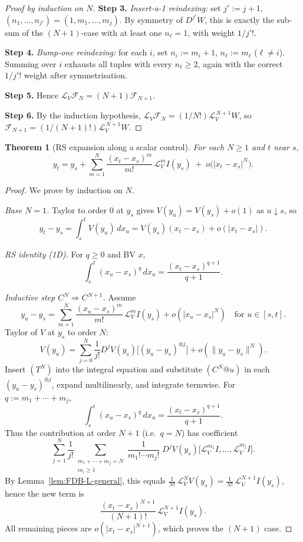 \documentclass[12pt]{article}
\newtheorem{theorem}{Theorem}[section]
\theoremstyle{remark}
\begin{document}
\begin{proof}[Proof by induction on $N$]
\noindent
\textbf{Step 3.} \emph{Insert-a-1 reindexing:} set $j':=j+1$, $(n_1,\dots,n_{j'})=(1,m_1,\dots,m_j)$.
By symmetry of $D^{j'}W$, this is exactly the sub-sum of the $(N\!+\!1)$-case with at least one $n_\ell=1$, with weight $1/j'!$.

\noindent
\textbf{Step 4.} \emph{Bump-one reindexing:} for each $i$, set $n_i:=m_i+1$, $n_\ell:=m_\ell$ ($\ell\neq i$).
Summing over $i$ exhausts all tuples with every $n_\ell\ge2$, again with the correct $1/j'!$ weight after symmetrisation.

\noindent
\textbf{Step 5.} Hence $\mathcal{L}_V\mathcal{F}_N=(N\!+\!1)\mathcal{F}_{N+1}$.

\noindent
\textbf{Step 6.} By the induction hypothesis,
$\mathcal{L}_V\mathcal{F}_N=(1/N!)\mathcal{L}_V^{\,N+1}W$, so $\mathcal{F}_{N+1}=(1/(N\!+\!1)!)\mathcal{L}_V^{\,N+1}W$.
\end{proof}


\begin{theorem}[RS expansion along a scalar control]\label{thm:CN}
For each $N\ge1$ and $t$ near $s$,
\[
\boxed{\;
y_t
= y_s+\sum_{m=1}^{N}\frac{(x_t-x_s)^m}{m!}\,\mathcal{L}_V^{m}I(y_s)
\;+\;o\big(|x_t-x_s|^{N}\big).
\;}
\]
\end{theorem}

\begin{proof}
We prove by induction on $N$.

\emph{Base $N=1$.} Taylor to order $0$ at $y_s$ gives $V(y_u)=V(y_s)+o(1)$ as $u\downarrow s$, so
\[
y_t-y_s=\int_s^t V(y_u)\,dx_u=V(y_s)(x_t-x_s)+o(|x_t-x_s|).
\]

\noindent\textit{RS identity (1D).} For $q\ge0$ and BV $x$,
\[
\int_s^t (x_u-x_s)^q\,dx_u=\frac{(x_t-x_s)^{q+1}}{q+1}.
\]

\emph{Inductive step $C^N\Rightarrow C^{N+1}$.}
Assume
\[
y_u-y_s=\sum_{m=1}^{N}\frac{(x_u-x_s)^m}{m!}\,\mathcal{L}_V^{m}I(y_s)+o(|x_u-x_s|^{N})
\quad\text{for }u\in[s,t].
\tag{$C^N@u$}
\]
Taylor of $V$ at $y_s$ to order $N$:
\[
V(y_u)=\sum_{j=0}^{N}\frac{1}{j!}D^{j}V(y_s)\big[(y_u-y_s)^{\otimes j}\big]
+o(\|y_u-y_s\|^{N}).
\tag{$T^N$}
\]
Insert $(T^N)$ into the integral equation and substitute $(C^N@u)$ in each $(y_u-y_s)^{\otimes j}$, expand multilinearly, and integrate termwise. For $q:=m_1+\cdots+m_j$,
\[
\int_s^t (x_u-x_s)^q\,dx_u=\frac{(x_t-x_s)^{q+1}}{q+1}.
\]
Thus the contribution at order $N\!+\!1$ (i.e.\ $q=N$) has coefficient
\[
\sum_{j=1}^{N}\frac{1}{j!}\!\!\sum_{\substack{m_1+\cdots+m_j=N\\ m_i\ge1}}
\frac{1}{m_1!\cdots m_j!}\;
D^{j}V(y_s)\big[\mathcal{L}_V^{m_1}I,\dots,\mathcal{L}_V^{m_j}I\big].
\]
By Lemma~\ref{lem:FDB-L-general}, this equals $\frac{1}{N!}\,\mathcal{L}_V^{N}V(y_s)=\frac{1}{N!}\,\mathcal{L}_V^{N+1}I(y_s)$, hence the new term is
\[
\frac{(x_t-x_s)^{N+1}}{(N+1)!}\,\mathcal{L}_V^{N+1}I(y_s).
\]
All remaining pieces are $o(|x_t-x_s|^{N+1})$, which proves the $(N\!+\!1)$ case.
\end{proof}
\end{document}
